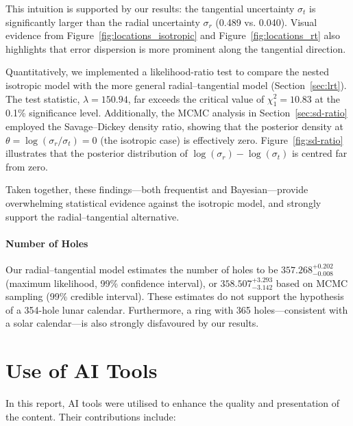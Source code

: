 \documentclass[11pt]{article}
\begin{document}
This intuition is supported by our results: the tangential uncertainty $\sigma_t$ is significantly larger than the radial uncertainty $\sigma_r$ (0.489 vs. 0.040). Visual evidence from Figure~\ref{fig:locations_isotropic} and Figure~\ref{fig:locations_rt} also highlights that error dispersion is more prominent along the tangential direction.

Quantitatively, we implemented a likelihood-ratio test to compare the nested isotropic model with the more general radial–tangential model (Section~\ref{sec:lrt}). The test statistic, $\lambda = 150.94$, far exceeds the critical value of $\chi^2_1 = 10.83$ at the 0.1\% significance level. Additionally, the MCMC analysis in Section~\ref{sec:sd-ratio} employed the Savage–Dickey density ratio, showing that the posterior density at $\theta = \log(\sigma_r/\sigma_t) = 0$ (the isotropic case) is effectively zero. Figure~\ref{fig:sd-ratio} illustrates that the posterior distribution of $\log(\sigma_r) - \log(\sigma_t)$ is centred far from zero.

Taken together, these findings—both frequentist and Bayesian—provide overwhelming statistical evidence against the isotropic model, and strongly support the radial–tangential alternative.

\paragraph{Number of Holes}

Our radial–tangential model estimates the number of holes to be $357.268^{+0.202}_{-0.008}$ (maximum likelihood, 99\% confidence interval), or $358.507^{+3.293}_{-3.142}$ based on MCMC sampling (99\% credible interval). These estimates do not support the hypothesis of a 354-hole lunar calendar. Furthermore, a ring with 365 holes—consistent with a solar calendar—is also strongly disfavoured by our results.



\clearpage
\newpage
\appendix
\section{Use of AI Tools}
In this report, AI tools were utilised to enhance the quality and presentation of the content. Their contributions include:
\end{document}
